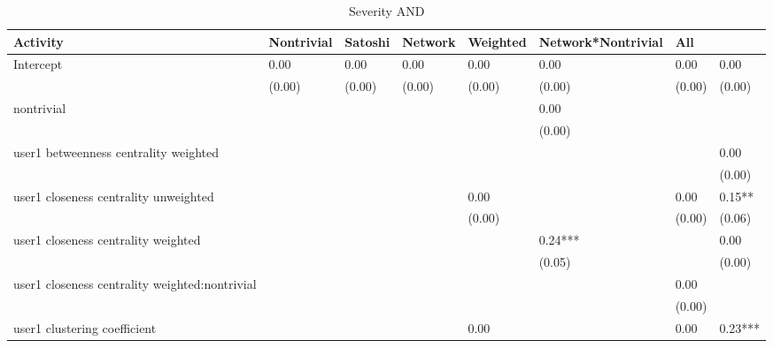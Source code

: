 \begin{table*}
\caption{Severity AND}
\begin{center}
\begin{tabular}{llllllll}
\hline
Activity 									                    & Nontrivial& Satoshi    & Network & Weighted & Network*Nontrivial		      &  All    \\
\hline
\hline
Intercept                                      & 0.00     & 0.00       & 0.00    & 0.00    & 0.00     & 0.00               & 0.00     \\
                                               & (0.00)   & (0.00)     & (0.00)  & (0.00)  & (0.00)   & (0.00)             & (0.00)   \\
nontrivial                                     &          &            &         &         & 0.00     &                    &          \\
                                               &          &            &         &         & (0.00)   &                    &          \\
user1 betweenness centrality weighted          &          &            &         &         &          &                    & 0.00     \\
                                               &          &            &         &         &          &                    & (0.00)   \\
user1 closeness centrality unweighted          &          &            &         & 0.00    &          & 0.00               & 0.15**   \\
                                               &          &            &         & (0.00)  &          & (0.00)             & (0.06)   \\
user1 closeness centrality weighted            &          &            &         &         & 0.24***  &                    & 0.00     \\
                                               &          &            &         &         & (0.05)   &                    & (0.00)   \\
user1 closeness centrality weighted:nontrivial &          &            &         &         &          & 0.00               &          \\
                                               &          &            &         &         &          & (0.00)             &          \\
user1 clustering coefficient                   &          &            &         & 0.00    &          & 0.00               & 0.23***  \\

\end{tabular}
\end{center}
\end{table*}
